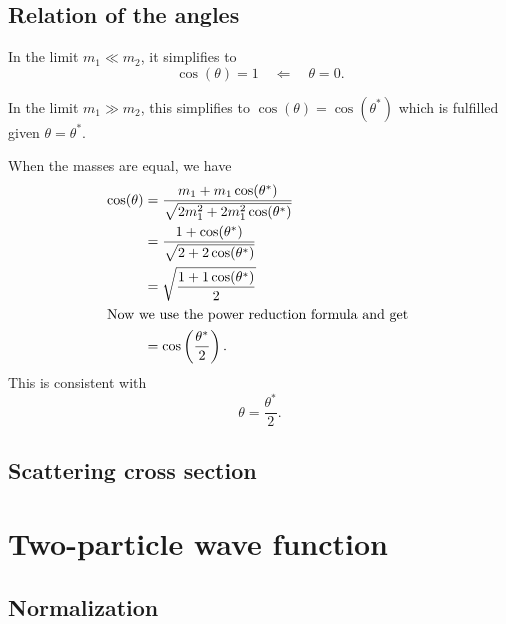 \documentclass[11pt, english, fleqn, DIV=15, headinclude, BCOR=1.5cm]{scrartcl}
\begin{document}
\subsection{Relation of the angles}


In the limit $m_1 \ll m_2$, it simplifies to
\[
    \cos(\theta) = 1
    \quad\Longleftarrow\quad
    \theta = 0.
\]

In the limit $m_1 \gg m_2$, this simplifies to $\cos(\theta) = \cos(\theta^*)$
which is fulfilled given $\theta = \theta^*$.

When the masses are equal, we have
\begin{align*}
    \cos(\theta)
    &= \frac{m_1 + m_1 \cos(\theta^*)}{\sqrt{2 m_1^2 + 2m_1^2 \cos(\theta^*)}} \\
    &= \frac{1 + \cos(\theta^*)}{\sqrt{2 + 2\cos(\theta^*)}} \\
    &= \sqrt{\frac{1 + 1\cos(\theta^*)}2} \\
    \intertext{%
        Now we use the power reduction formula and get
    }
    &= \cos\del{\frac{\theta^*}{2}}.
\end{align*}
This is consistent with
\[
    \theta = \frac{\theta^*}2.
\]


\subsection{Scattering cross section}


\section{Two-particle wave function}

\subsection{Normalization}
\end{document}
